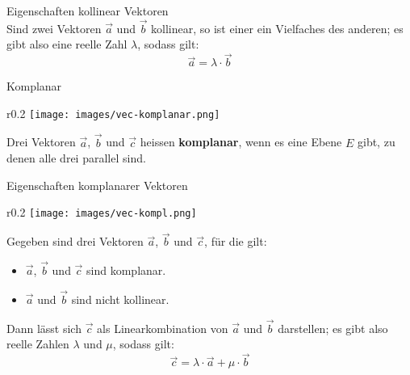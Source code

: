 \begin{theorem}{Eigenschaften kollinear Vektoren}\\
    Sind zwei Vektoren $\vec{a}$ und $\vec{b}$ kollinear, so ist einer ein Vielfaches des anderen; 
    es gibt also eine reelle Zahl $\lambda$, sodass gilt: 
    \begin{equation*}
        \vec{a}=\lambda\cdot\vec{b}
    \end{equation*}
\end{theorem}

\begin{definition}{Komplanar}
    \begin{wrapfigure}{r}{0.2\linewidth}
        \vspace{-10pt}
        \texttt{[image: images/vec-komplanar.png]}
    \end{wrapfigure}
    Drei Vektoren $\vec{a}$, $\vec{b}$ und $\vec{c}$ heissen \textbf{komplanar}, 
    wenn es eine Ebene $E$ gibt, zu denen alle drei parallel sind.
    \vspace{5pt}
\end{definition}

\begin{theorem}{Eigenschaften komplanarer Vektoren}\\
    \begin{wrapfigure}{r}{0.2\linewidth}
        \vspace{-10pt}
        \texttt{[image: images/vec-kompl.png]}
    \end{wrapfigure}
    Gegeben sind drei Vektoren $\vec{a}$, $\vec{b}$ und $\vec{c}$, für die gilt:
    \begin{itemize}
        \item $\vec{a}$, $\vec{b}$ und $\vec{c}$ sind komplanar.
        \item $\vec{a}$ und $\vec{b}$ sind nicht kollinear.
    \end{itemize} 
    Dann lässt sich $\vec{c}$ als Linearkombination von $\vec{a}$ und $\vec{b}$ darstellen; 
    es gibt also reelle Zahlen $\lambda$ und $\mu$, sodass gilt:
    \begin{equation*}
        \vec{c}=\lambda\cdot\vec{a}+\mu\cdot\vec{b}
    \end{equation*}
\end{theorem}

